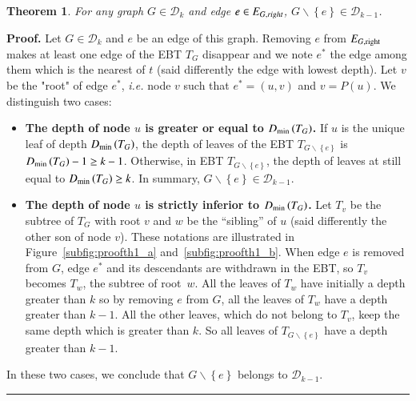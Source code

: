 \documentclass[preprint]{elsarticle}
\newtheorem{theorem}{Theorem}
\newenvironment{proof}[1][Proof]{\textbf{#1.} }{\ \rule{0.5em}{0.5em}}
\newcommand{\set}[1]{\left\{ #1 \right\}}
\newcommand{\card}[1]{\left| #1 \right|}
\newcommand{\mcalg}{\mathcal{G}}
\newcommand{\mcald}{\mathcal{D}}
\newcommand{\compbin}[1]{\mathcal{C}_{\mbox{\scriptsize{B}}}\left( #1 \right)}
\newcommand{\dmin}{D_{\mbox{\scriptsize{min}}}}
\newcommand{\eright}[1]{E_{#1, \mbox{\scriptsize{right}}}}
\begin{document}
\begin{theorem}
For any graph $G \in \mcald_k$ and edge $e \in E_{G, \emph{right}}$, $G \backslash \set{e} \in \mcald_{k-1}$.
\label{th:completebinary}
\end{theorem}
\begin{proof}
Let $G \in \mcald_k$ and $e$ be an edge of this graph. Removing $e$ from $\eright{G}$ makes at least one edge of the EBT $T_G$ disappear and we note $e^*$ the edge among them which is the nearest of $t$ (said differently the edge with lowest depth). Let $v$ be the "root" of edge $e^*$, {\em i.e.} node $v$ such that $e^* = (u, v)$ and $v = P(u)$. We distinguish two cases:
\begin{itemize}
\item {\bf The depth of node $u$ is greater or equal to $\dmin\left(T_G\right)$.} If $u$ is the unique leaf of depth $\dmin\left(T_G\right)$, the depth of leaves of the EBT $T_{G\backslash \set{e}}$ is $\dmin\left(T_G\right) - 1 \geq k-1$. Otherwise, in EBT $T_{G\backslash \set{e}}$, the depth of leaves at still equal to $\dmin\left(T_G\right) \geq k$. In summary, $G\backslash \set{e} \in \mcald_{k-1}$.
\item {\bf The depth of node $u$ is strictly inferior to $\dmin\left(T_G\right)$.} Let $T_v$ be the subtree of $T_G$ with root $v$ and $w$ be the ``sibling'' of $u$ (said differently the other son of node $v$). These notations are illustrated in Figure~\ref{subfig:proofth1_a} and~\ref{subfig:proofth1_b}. When edge $e$ is removed from $G$, edge $e^*$ and its descendants are withdrawn in the EBT, so $T_v$ becomes $T_w$, the subtree of root~$w$. All the leaves of $T_w$ have initially a depth greater than $k$ so by removing $e$ from $G$, all the leaves of $T_w$ have a depth greater than $k-1$. All the other leaves, which do not belong to $T_v$, keep the same depth which is greater than $k$. So all leaves of $T_{G \backslash \set{e}}$ have a depth greater than $k-1$.
\end{itemize}
In these two cases, we conclude that $G\backslash \set{e}$ belongs to  
$\mcald_{k-1}$.
\end{proof}
\end{document}
